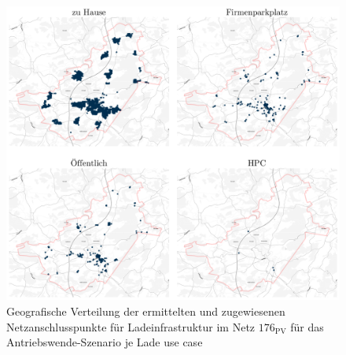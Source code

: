 \begin{figure}[H]
    \centering
    \includegraphics[width=\textwidth]{Bilder/cps_in_grid_176}
    \caption[Geo­gra­fische Verteilung der ermittelten und zugewiesenen Netzanschlusspunkte für Ladeinfrastruktur im Netz \num{176} für das Antriebswende-Szenario je Lade use case]{Geo­gra­fische Verteilung der ermittelten und zugewiesenen Netzanschlusspunkte für Ladeinfrastruktur im Netz \(176_{\text{PV}}\) für das Antriebswende-Szenario je Lade use case}\label{fig:cps_in_grid}
\end{figure}